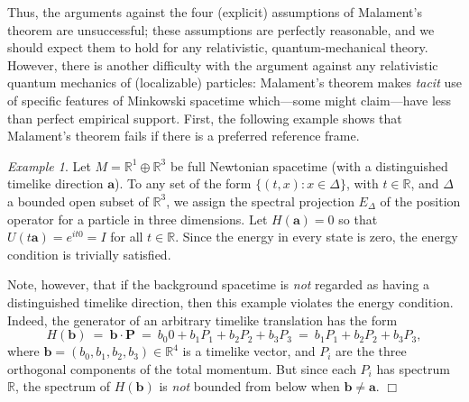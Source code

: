 \documentclass[11pt]{article}
\theoremstyle{remark}
\newtheorem{example}{Example}
\begin{document}
Thus, the arguments against the four (explicit) assumptions of
Malament's theorem are unsuccessful; these assumptions are perfectly
reasonable, and we should expect them to hold for any relativistic,
quantum-mechanical theory.  However, there is another difficulty with
the argument against any relativistic quantum mechanics of
(localizable) particles: Malament's theorem makes \emph{tacit} use of
specific features of Minkowski spacetime which---some might
claim---have less than perfect empirical support.  First, the
following example shows that Malament's theorem fails if there is a
preferred reference frame.

\begin{example} \label{aristotle} Let $M=\mathbb{R}^{1}\oplus
  \mathbb{R}^{3}$ be full Newtonian spacetime (with a distinguished
  timelike direction $\mathbf{a}$).  To any set of the form $\{
  (t,x):x\in \Delta \}$, with $t\in \mathbb{R}$, and $\Delta$ a
  bounded open subset of $\mathbb{R}^{3}$, we assign the spectral
  projection $E_{\Delta}$ of the position operator for a particle in
  three dimensions.  Let $H(\mathbf{a})=0$ so that
  $U(t\mathbf{a})=e^{it0}=I$ for all $t\in \mathbb{R}$.  Since the
  energy in every state is zero, the energy condition is trivially
  satisfied.
  
  Note, however, that if the background spacetime is \emph{not}
  regarded as having a distinguished timelike direction, then this
  example violates the energy condition.  Indeed, the generator of an
  arbitrary timelike translation has the form
\begin{equation}
H(\mathbf{b}) \:=\: \mathbf{b}\cdot \mathbf{P}\:=
\:b_{0}0+b_{1}P_{1}+b_{2}P_{2}+b_{3}P_{3}\:=\:b_{1}P_{1}+b_{2}P_{2}+b_{3}P_{3},
\end{equation} where
$\mathbf{b}=(b_{0},b_{1},b_{2},b_{3})\in \mathbb{R}^{4}$ is a timelike
vector, and $P_{i}$ are the three orthogonal components of the total
momentum.  But since each $P_{i}$ has spectrum $\mathbb{R}$, the
spectrum of $H(\mathbf{b})$ is \emph{not} bounded from below when
$\mathbf{b}\neq \mathbf{a}$.  \hfill $\Box$
\end{example}
\end{document}
